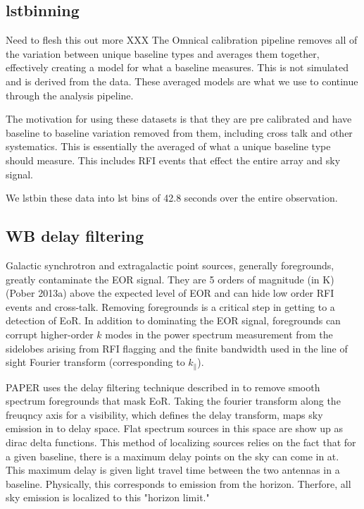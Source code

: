 \documentclass[twocolumn,numberedappendix]{emulateapj}
\begin{document}
\subsection{lstbinning}
Need to flesh this out more XXX
The Omnical calibration pipeline removes all of the variation between unique
baseline types and averages them together, effectively creating a model for what
a baseline measures. This is not simulated and is derived from the data. These
averaged models are what we use to continue through the analysis pipeline. 

The motivation for using these datasets is that they are pre calibrated and have
baseline to baseline variation removed from them, including cross talk and other
systematics. This is essentially the averaged of what a unique baseline type
should measure. This includes RFI events that effect the entire array and sky
signal. 

We lstbin these data into lst bins of 42.8 seconds over the entire observation.

\subsection{WB delay filtering}
Galactic synchrotron and extragalactic point sources, generally foregrounds,
greatly contaminate the EOR signal. They are 5 orders of magnitude (in K)
(Pober 2013a) above the expected level of EOR and can hide low order RFI events
and cross-talk. Removing foregrounds is a critical step in getting to a
detection of EoR. In addition to dominating the EOR signal, foregrounds can
corrupt higher-order $k$ modes in the power spectrum measurement from the
sidelobes arising from RFI flagging and the finite bandwidth used in the line
of sight Fourier transform (corresponding to $k_{\parallel}$). 

PAPER uses the delay filtering technique described in \citep{parsons_2012b} to
remove smooth spectrum foregrounds that mask EoR. Taking the fourier transform
along the freuqncy axis for a visibility, which defines the delay transform,
maps sky emission in to delay space. Flat spectrum sources in this space are
show up as dirac delta functions. This method of localizing sources relies on
the fact that for a given baseline, there is a maximum delay points on the sky
can come in at. This maximum delay is given light travel time between the two
antennas in a baseline. Physically, this corresponds to emission from the
horizon. Therfore, all sky emission is localized to this "horizon limit."
\end{document}
